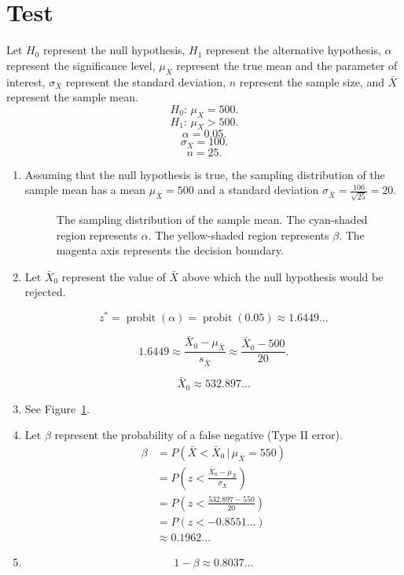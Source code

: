 \documentclass[12pt]{article}
\DeclareMathOperator{\probit}{probit}
\begin{document}
\section{Test}
Let $H_0$ represent the null hypothesis, $H_1$ represent the alternative hypothesis, $\alpha$ represent the significance level, $\mu_X$ represent the true mean and the parameter of interest, $\sigma_X$ represent the standard deviation, $n$ represent the sample size, and $\bar{X}$ represent the sample mean.
\[H_0:\,\mu_X=500.\]
\[H_1:\,\mu_X>500.\]
\[\alpha=0.05.\]
\[\sigma_X=100.\]
\[n=25.\]
\begin{enumerate}
\item Assuming that the null hypothesis is true, the sampling distribution of the sample mean has a mean $\mu_{\bar{X}}=500$ and a standard deviation $\sigma_{\bar{X}}=\frac{100}{\sqrt{25}}=20$.
\begin{figure}
\begin{center}
\end{center}
\caption{The sampling distribution of the sample mean. The cyan-shaded region represents $\alpha$. The yellow-shaded region represents $\beta$. The magenta axis represents the decision boundary.\label{fig:samplingdistributionofsamplemean}}
\end{figure}
\item Let $\bar{X}_0$ represent the value of $\bar{X}$ above which the null hypothesis would be rejected.

\[z^*=\probit(\alpha)=\probit(0.05)\approx 1.6449\dots\]

\[1.6449\approx\frac{\bar{X}_0-\mu_{\bar{X}}}{s_{\bar{X}}}\approx\frac{\bar{X}_0-500}{20}.\]

\[\bar{X}_0\approx 532.897\dots\]
\item See Figure~\ref{fig:samplingdistributionofsamplemean}.
\item Let $\beta$ represent the probability of a false negative (Type II error).
\begin{align*}
\beta
&=P(\bar{X}<\bar{X}_0\,|\,\mu_{\bar{X}}=550)\\
&=P\left(z<\frac{\bar{X}_0-\mu_{\bar{X}}}{\sigma_{\bar{X}}}\right)\\
&=P\left(z<\frac{532.897-550}{20}\right)\\
&=P(z<-0.8551\dots)\\
&\approx 0.1962\dots
\end{align*}
\item\[1-\beta\approx 0.8037\dots\]
\end{enumerate}
\end{document}
